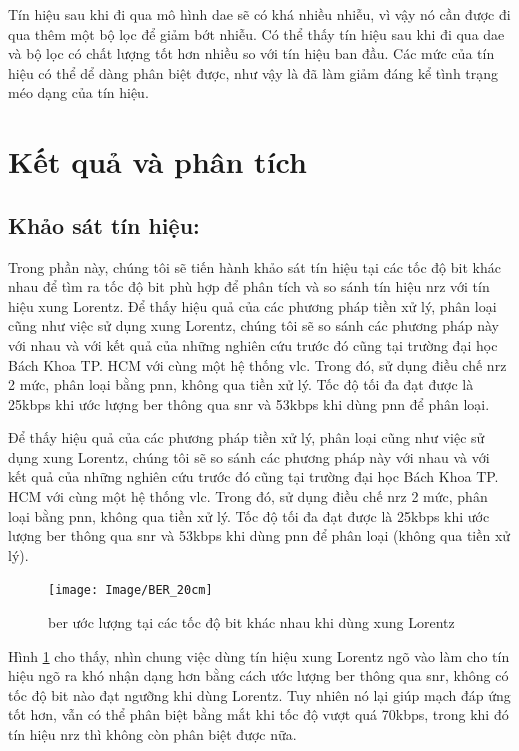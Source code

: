 Tín hiệu sau khi đi qua mô hình \ac{dae} sẽ có khá nhiều nhiễu, vì vậy nó cần được đi qua thêm một bộ lọc để giảm bớt nhiễu. Có thể thấy tín hiệu sau khi đi qua \ac{dae} và bộ lọc có chất lượng tốt hơn nhiều so với tín hiệu ban đầu. Các mức của tín hiệu có thể dể dàng phân biệt được, như vậy là đã làm giảm đáng kể tình trạng méo dạng của tín hiệu.

\section{Kết quả và phân tích}
\subsection{Khảo sát tín hiệu:} 
Trong phần này, chúng tôi sẽ tiến hành khảo sát tín hiệu tại các tốc độ bit khác nhau để tìm ra tốc độ bit phù hợp để phân tích và so sánh tín hiệu \ac{nrz} với tín hiệu xung Lorentz. Để thấy hiệu quả của các phương pháp tiền xử lý, phân loại cũng như việc sử dụng xung Lorentz, chúng tôi sẽ so sánh các phương pháp này với nhau và với kết quả của những nghiên cứu trước đó cũng tại trường đại học Bách Khoa TP. HCM với cùng một hệ thống \ac{vlc}. Trong đó, sử dụng điều chế \ac{nrz} 2 mức, phân loại bằng \ac{pnn}, không qua tiền xử lý. Tốc độ tối đa đạt được là 25kbps khi ước lượng \ac{ber} thông qua \ac{snr} và 53kbps khi dùng \ac{pnn} để phân loại.

Để thấy hiệu quả của các phương pháp tiền xử lý, phân loại cũng như việc sử dụng xung Lorentz, chúng tôi sẽ so sánh các phương pháp này với nhau và với kết quả của những nghiên cứu trước đó cũng tại trường đại học Bách Khoa TP. HCM với cùng một hệ thống \ac{vlc}. Trong đó, sử dụng điều chế \ac{nrz} 2 mức, phân loại bằng \ac{pnn}, không qua tiền xử lý. Tốc độ tối đa đạt được là 25kbps khi ước lượng \ac{ber} thông qua \ac{snr} và 53kbps khi dùng \ac{pnn} để phân loại (không qua tiền xử lý).

\begin{figure} [ht]
	\centering
	\captionsetup{justification=centering}
	\texttt{[image: Image/BER\_20cm]}
	\caption{\ac{ber} ước lượng tại các tốc độ bit khác nhau khi dùng xung Lorentz}
	\label{fig:BER_20cm}
\end{figure}
Hình \ref{fig:BER_20cm} cho thấy, nhìn chung việc dùng tín hiệu xung Lorentz ngõ vào làm cho tín hiệu ngõ ra khó nhận dạng hơn bằng cách ước lượng \ac{ber} thông qua \ac{snr}, không có tốc độ bit nào đạt ngưỡng khi dùng Lorentz. Tuy nhiên nó lại giúp mạch đáp ứng tốt hơn, vẫn có thể phân biệt bằng mắt khi tốc độ vượt quá 70kbps, trong khi đó tín hiệu \ac{nrz} thì không còn phân biệt được nữa.
 
